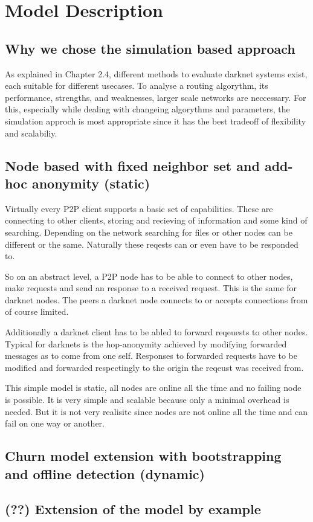 \chapter{Model Description}

\section{Why we chose the simulation based approach}

As explained in Chapter 2.4, different methods to evaluate darknet systems exist, each suitable for different usecases. To analyse a routing algorythm, its performance, strengths, and weaknesses, larger scale networks are neccessary. For this, especially while dealing with changeing algorythms and parameters, the simulation approch is most appropriate since it has the best tradeoff of flexibility and scalabiliy.

\section{Node based with fixed neighbor set and add-hoc anonymity (static)}

Virtually every P2P client supports a basic set of capabilities. These are connecting to other clients, storing and recieving of information and some kind of searching. Depending on the network searching for files or other nodes can be different or the same. Naturally these reqests can or even have to be responded to.

So on an abstract level, a P2P node has to be able to connect to other nodes, make requests and send an response to a received request. This is the same for darknet nodes. The peers a darknet node connects to or accepts connections from of course limited.

Additionally a darknet client has to be abled to forward reqeuests to other nodes. Typical for darknets is the hop-anonymity achieved by modifying forwarded messages as to come from one self. Responses to forwarded requests have to be modified and forwarded respectingly to the origin the reqeust was received from.

This simple model is static, all nodes are online all the time and no failing node is possible. It is very simple and scalable because only a minimal overhead is needed. But it is not very realisitc since nodes are not online all the time and can fail on one way or another.

\section{Churn model extension with bootstrapping and offline detection (dynamic)}



\section{(??) Extension of the model by example}
